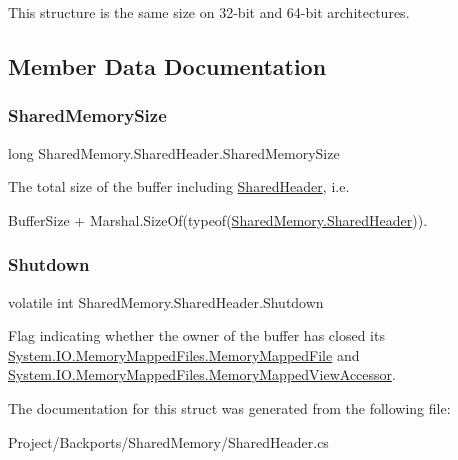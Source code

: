 This structure is the same size on 32-\/bit and 64-\/bit architectures.

\subsection{Member Data Documentation}
\mbox{\label{struct_shared_memory_1_1_shared_header_abc3cc4a636cd2a69034692a0efb6f264}} 
\subsubsection{\texorpdfstring{Shared\+Memory\+Size}{SharedMemorySize}}
{\footnotesize\ttfamily long Shared\+Memory.\+Shared\+Header.\+Shared\+Memory\+Size}



The total size of the buffer including \hyperlink{struct_shared_memory_1_1_shared_header}{Shared\+Header}, i.\+e. 

{\ttfamily Buffer\+Size + Marshal.\+Size\+Of(typeof(\hyperlink{struct_shared_memory_1_1_shared_header}{Shared\+Memory.\+Shared\+Header}))}. \mbox{\label{struct_shared_memory_1_1_shared_header_a322c651d49080ce9021fed3e79aeee5b}} 
\subsubsection{\texorpdfstring{Shutdown}{Shutdown}}
{\footnotesize\ttfamily volatile int Shared\+Memory.\+Shared\+Header.\+Shutdown}



Flag indicating whether the owner of the buffer has closed its \hyperlink{class_system_1_1_i_o_1_1_memory_mapped_files_1_1_memory_mapped_file}{System.\+I\+O.\+Memory\+Mapped\+Files.\+Memory\+Mapped\+File} and \hyperlink{class_system_1_1_i_o_1_1_memory_mapped_files_1_1_memory_mapped_view_accessor}{System.\+I\+O.\+Memory\+Mapped\+Files.\+Memory\+Mapped\+View\+Accessor}. 



The documentation for this struct was generated from the following file\+:\begin{DoxyCompactItemize}
\item 
Project/\+Backports/\+Shared\+Memory/Shared\+Header.\+cs\end{DoxyCompactItemize}
